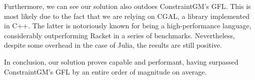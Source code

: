 Furthermore, we can see our solution also outdoes ConstraintGM's \ac{GFL}.  This
is most likely due to the fact that we are relying on \ac{CGAL}, a library
implemented in C++.  The latter is notoriously known for being a
high-performance language, considerably outperforming Racket in a series of
benchmarks.  Nevertheless, despite some overhead in the case of Julia, the
results are still positive.

In conclusion, our solution proves capable and performant, having surpassed
ConstraintGM's \ac{GFL} by an entire order of magnitude on average.
